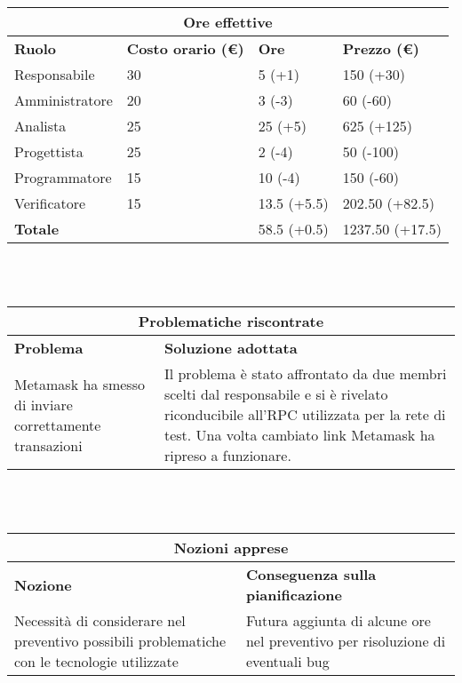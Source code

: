 \documentclass[a4paper, 12pt]{article}
\begin{document}
\begin{center}
    \begin{tabularx}{\textwidth}{|X|X|X|X|}
        \hline
        \multicolumn{4}{|c|}{\textbf{Ore effettive}}\\
        \hline
        \hline
        \textbf{Ruolo} & \textbf{Costo orario (\euro)} & \textbf{Ore} & \textbf{Prezzo (\euro)}\\
        \hline
        Responsabile    & 30 & 5 (+1) & 150 (+30)\\
        \hline
        Amministratore  & 20 & 3 (-3)  & 60 (-60)\\
        \hline
        Analista        & 25 & 25 (+5)  & 625 (+125)\\
        \hline
        Progettista     & 25 & 2 (-4) & 50 (-100)\\
        \hline
        Programmatore   & 15 & 10 (-4) & 150 (-60)\\
        \hline
        Verificatore    & 15 & 13.5 (+5.5) & 202.50 (+82.5)\\
        \hline
        \hline
        \textbf{Totale} &    & 58.5 (+0.5) & 1237.50 (+17.5)\\
        \hline
    \end{tabularx}\\[8pt]
    \mbox{}\\
\end{center}

\begin{center}
    \begin{tabularx}{\textwidth}{|X|X|}
        \hline
        \multicolumn{2}{|c|}{\textbf{Problematiche riscontrate}}\\
        \hline
        \hline
        \textbf{Problema} & \textbf{Soluzione adottata}\\
        \hline
        Metamask ha smesso di inviare correttamente transazioni & Il problema è stato affrontato da due membri scelti dal responsabile e si è rivelato riconducibile all'RPC utilizzata per la rete di test.
        Una volta cambiato link Metamask ha ripreso a funzionare.\\
        \hline
    \end{tabularx}\\[8pt]
    \mbox{}\\
\end{center}

\begin{center}
    \begin{tabularx}{\textwidth}{|X|X|}
        \hline
        \multicolumn{2}{|c|}{\textbf{Nozioni apprese}}\\
        \hline
        \hline
        \textbf{Nozione} & \textbf{Conseguenza sulla pianificazione}\\
        \hline
        Necessità di considerare nel preventivo possibili problematiche con le tecnologie utilizzate & Futura aggiunta di alcune ore nel preventivo per risoluzione di eventuali bug\\
        \hline
    \end{tabularx}\\[8pt]
    \mbox{}\\
\end{center}
\end{document}
